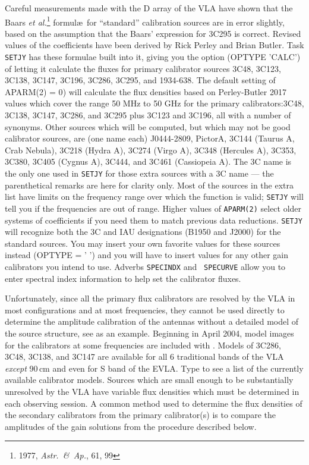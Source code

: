       Careful measurements made with the D array of the VLA have shown
that the Baars {\it et al.\/}\footnote{1977, {\it Astr.~\&\ Ap.}, 61,
99} formul\ae\ for ``standard'' calibration sources are in error
slightly, based on the assumption that the Baars' expression for 3C295
is correct.   Revised values of the coefficients have been derived by
Rick Perley and Brian Butler.  Task {\tt SETJY} has these formulae
built into it, giving you the option ({\us OPTYPE 'CALC'}) of letting
it calculate the fluxes for primary calibrator sources 3C48, 3C123,
3C138, 3C147, 3C196, 3C286, 3C295, and 1934-638.  The default setting
of {\us APARM(2) = 0}) will calculate the flux densities based on
Perley-Butler 2017 values which cover the range 50 MHz to 50 GHz for
the primary calibrators:3C48, 3C138, 3C147, 3C286, and 3C295 plus
3C123 and 3C196, all with a number of synonyms.  Other sources which
will be computed, but which may not be good calibrator sources,
are (one name each) J0444-2809, PictorA, 3C144 (Taurus A, Crab
Nebula), 3C218 (Hydra A), 3C274 (Virgo A), 3C348 (Hercules A), 3C353,
3C380, 3C405 (Cygnus A), 3C444, and 3C461 (Cassiopeia A).  The 3C name
is the only one used in {\tt SETJY} for those extra sources with a 3C
name --- the parenthetical remarks are here for clarity only.  Most of
the sources in the extra list have limits on the frequency range over
which the function is valid; {\tt SETJY} will tell you if the
frequencies are out of range.  Higher values of {\tt APARM(2)} select
older systems of coefficients if you need them to match previous data
reductions.  {\tt SETJY} will recognize both the 3C and IAU
designations (B1950 and J2000) for the standard sources.  You may
insert your own favorite values for these sources instead ({\us OPTYPE
= ' '}) and you will have to insert values for any other gain
calibrators you intend to use.  Adverbs {\tt SPECINDX} and {\tt
SPECURVE} allow you to enter spectral index information to help set
the calibrator fluxes.

      Unfortunately, since all the primary flux calibrators are
resolved by the VLA in most configurations and at most frequencies,
they cannot be used directly to determine the amplitude calibration of
the antennas without a detailed model of the source structure, see
 as an example.  Beginning in April 2004, model images
for the calibrators at some frequencies are included with \AIPS\@.
Models of 3C286, 3C48, 3C138, and 3C147 are available for all 6
traditional bands of the VLA {\it except} 90\,cm and even for S band
of the EVLA.  Type {\us {} \CR} to see a list of the
currently available calibrator models.  Sources which are small enough
to be substantially unresolved by the VLA have variable flux densities
which must be determined in each observing session.  A common method
used to determine the flux densities of the secondary calibrators from
the primary calibrator(s) is to compare the amplitudes of the gain
solutions from the procedure described below.

